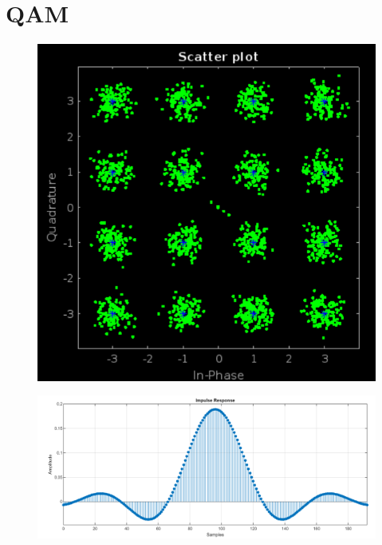 \chapter{QAM}
\label{section:qam}



\vspace{3mm}

    \begin{figure}[h]
    	\centering
    	\includegraphics[width=1\textwidth]{img/matlab/qam.PNG}
    	\caption{}
    	\label{fig:qam}
    \end{figure}
    
\vspace{3mm}






\vspace{3mm}

    \begin{figure}[h]
    	\centering
    	\includegraphics[width=1\textwidth]{img/matlab/rrc.PNG}
    	\caption{}
    	\label{fig:rrc}
    \end{figure}
    
\vspace{3mm}